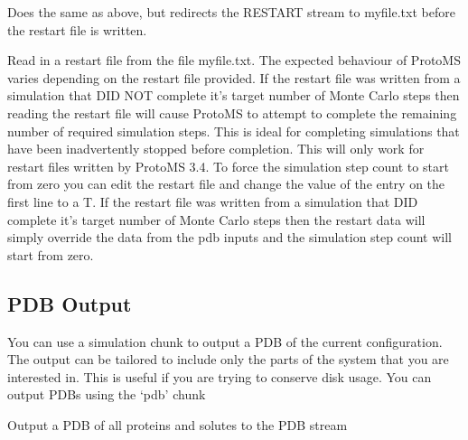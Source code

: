 \documentclass[letterpaper,10pt,english]{sphinxmanual}
\begin{document}
Does the same as above, but redirects the RESTART stream to myfile.txt before the restart file is written.

%
\begin{sphinxVerbatim}[commandchars=\\\{\}]
   
\end{sphinxVerbatim}

Read in a restart file from the file myfile.txt. The expected behaviour of ProtoMS varies depending on the restart file provided. If the restart file was written from a simulation that DID NOT complete it’s target number of Monte Carlo steps then reading the restart file will cause ProtoMS to attempt to complete the remaining number of required simulation steps. This is ideal for completing simulations that have been inadvertently stopped before completion. This will only work for restart files written by ProtoMS 3.4. To force the simulation step count to start from zero you can edit the restart file and change the value of the entry on the first line to a T. If the restart file was written from a simulation that DID complete it’s target number of Monte Carlo steps then the restart data will simply override the data from the pdb inputs and the simulation step count will start from zero.


\subsection{PDB Output}
\label{\detokenize{protoms:pdb-output}}
\ignorespaces 
You can use a simulation chunk to output a PDB of the current configuration. The output can be tailored to include only the parts of the system that you are interested in. This is useful if you are trying to conserve disk usage. You can output PDBs using the ‘pdb’ chunk

%
\begin{sphinxVerbatim}[commandchars=\\\{\}]
  
\end{sphinxVerbatim}

Output a PDB of all proteins and solutes to the PDB stream

%
\begin{sphinxVerbatim}[commandchars=\\\{\}]
  
\end{sphinxVerbatim}
\end{document}
